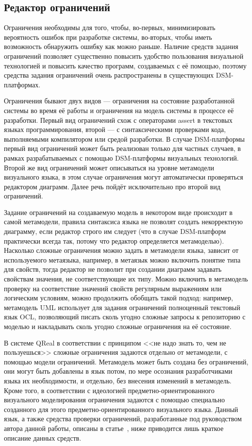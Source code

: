 \subsection{Редактор ограничений}
Ограничения необходимы для того, чтобы, во-первых, минимизировать вероятность ошибок 
при разработке системы, во-вторых, чтобы иметь возможность обнаружить ошибку как можно 
раньше. Наличие средств задания ограничений позволяет существенно повысить удобство 
пользования визуальной технологией и повысить качество программ, создаваемых с её помощью, 
поэтому средства задания ограничений очень распространены в существующих \ac{DSM}-платформах. 

Ограничения бывают двух видов --- ограничения на состояние разработанной системы во 
время её работы и ограничения на модель системы в процессе её разработки. Первый 
вид ограничений схож с операторами assert в текстовых языках программирования, второй --- 
с синтаксическими проверками кода, выполняемыми компилятором или средой разработки. 
В случае \ac{DSM}-платформы первый вид ограничений может быть реализован только для частных 
случаев, в рамках разрабатываемых с помощью \ac{DSM}-платформы визуальных технологий. Второй 
же вид ограничений может описываться на уровне метамодели визуального языка, в этом 
случае ограничения могут автоматически проверяться редактором диаграмм. Далее речь 
пойдёт исключительно про второй вид ограничений.

Задание ограничений на создаваемую модель в некотором виде происходит в самой метамодели, 
правила синтаксиса языка не позволят создать некорректную диаграмму, если редактор строго 
им следует (что в случае \ac{DSM}-платформ практически всегда так, потому что редактор 
определяется метамоделью). Насколько сложные ограничения можно задать в метамодели 
языка, зависит от используемого метаязыка, например, в метаязык можно включить понятие 
типа для свойств, тогда редактор не позволит при создании диаграмм задавать свойствам 
значения, не соответствующие их типу. Можно включить в метамодель проверку на соответствие 
значений свойств регулярным выражениям или логическим условиям, можно продолжить обобщать 
такой подход: например, метамодель UML использует для задания ограничений полноценный 
текстовый язык OCL, позволяющий писать сколь угодно сложные запросы к репозиторию с 
моделью и накладывать сколь угодно сложные ограничения на её состояние.

В системе QReal в соответствии с принципом <<не надо знать то, чем не пользуешься>> 
сложные ограничения задаются отдельно от метамодели, с помощью модели ограничений. 
Метамодель может быть создана без ограничений, они могут быть добавлены в язык потом,
по мере осознания разработчиками языка их необходимости, и отдельно, без внесения 
изменений в метамодель. Кроме того, в соответствии с идеологией предметно-ориентированного 
визуального моделирования ограничения задаются с помощью специально созданного для 
этого предметно-ориентированного визуального языка. Данный язык, а также средства 
проверки ограничений, разработанные под руководством автора данной работы, 
описаны в статье~\cite{deripaska2013constraints}, ниже приводится лишь краткое описание данных средств.

